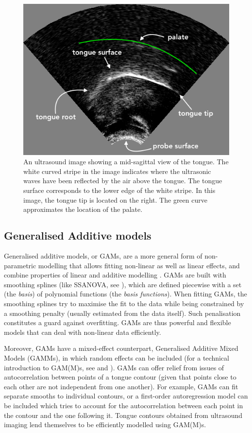 \documentclass[12pt,]{article}
\begin{document}
\begin{figure}
  \centering
  \includegraphics{./img/uti.png}
  \caption{An ultrasound image showing a mid-sagittal view of the tongue. The white curved stripe in the image indicates where the ultrasonic waves have been reflected by the air above the tongue. The tongue surface corresponds to the lower edge of the white stripe. In this image, the tongue tip is located on the right. The green curve approximates the location of the palate.}
  \label{f:uti}
\end{figure}

\hypertarget{generalised-additive-models}{%
\subsection{Generalised Additive
models}\label{generalised-additive-models}}

Generalised additive models, or GAMs, are a more general form of
non-parametric modelling that allows fitting non-linear as well as
linear effects, and combine properties of linear and additive modelling
\citep{hastie1986}. GAMs are built with smoothing splines (like SSANOVA,
see \citealt{helwig2016}), which are defined piecewise with a set (the
\emph{basis}) of polynomial functions (the \emph{basis functions}). When
fitting GAMs, the smoothing splines try to maximise the fit to the data
while being constrained by a smoothing penalty (usually estimated from
the data itself). Such penalisation constitutes a guard against
overfitting. GAMs are thus powerful and flexible models that can deal
with non-linear data efficiently.

Moreover, GAMs have a mixed-effect counterpart, Generalised Additive
Mixed Models (GAMMs), in which random effects can be included (for a
technical introduction to GAM(M)s, see \citealt{zuur2012} and
\citealt{wood2017}). GAMs can offer relief from issues of
autocorrelation between points of a tongue contour (given that points
close to each other are not independent from one another). For example,
GAMs can fit separate smooths to individual contours, or a first-order
autoregression model can be included which tries to account for the
autocorrelation between each point in the contour and the one following
it. Tongue contours obtained from ultrasound imaging lend themselves to
be efficiently modelled using GAM(M)s.
\end{document}
